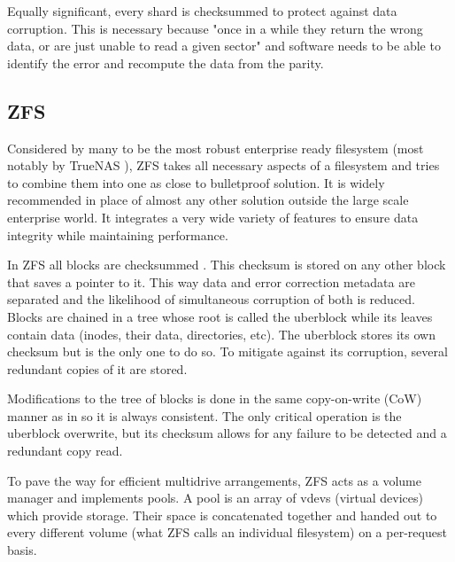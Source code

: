             Equally significant, every shard is checksummed to protect against data
            corruption. This is necessary because "once in a while they return
            the wrong data, or are just unable to read a given sector"
            \cite{Backblaze_arch} and software needs to be able to identify the
            error and recompute the data from the parity.

        \subsection{ZFS}
            \label{sec:ZFS}

            Considered by many to be the most robust enterprise ready
            filesystem \cite{ZFS_reliability} (most notably by TrueNAS
            \cite{TrueNAS_enterprise}), ZFS takes all necessary aspects of a
            filesystem and tries to combine them into one as close to
            bulletproof solution. It is widely recommended in place of almost
            any other solution outside the large scale enterprise world. It
            integrates a very wide variety of features to ensure data integrity
            while maintaining performance.

            In ZFS all blocks are checksummed \cite{ZFS}. This checksum is
            stored on any other block that saves a pointer to it. This way data
            and error correction metadata are separated and the likelihood of
            simultaneous corruption of both is reduced. Blocks are chained in a
            tree whose root is called the uberblock while its leaves
            contain data (inodes, their data, directories, etc). The
            uberblock stores its own checksum but is the only one to do so. To
            mitigate against its corruption, several redundant copies of it are
            stored.

            Modifications to the tree of blocks is done in the same
            copy-on-write (CoW) manner as in  so it is
            always consistent. The only critical operation is the uberblock
            overwrite, but its checksum allows for any failure to be detected
            and a redundant copy read.

            To pave the way for efficient multidrive arrangements, ZFS acts as
            a volume manager and implements pools. A pool is an array of vdevs
            (virtual devices) which provide storage. Their space is
            concatenated together and handed out to every different volume
            (what ZFS calls an individual filesystem) on a per-request basis.

